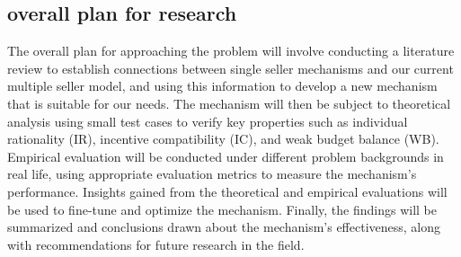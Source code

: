 \subsection{overall plan for research}

The overall plan for approaching the problem will involve conducting a literature review to establish connections between single seller mechanisms and our current multiple seller model, and using this information to develop a new mechanism that is suitable for our needs. The mechanism will then be subject to theoretical analysis using small test cases to verify key properties such as individual rationality (IR), incentive compatibility (IC), and weak budget balance (WB). Empirical evaluation will be conducted under different problem backgrounds in real life, using appropriate evaluation metrics to measure the mechanism's performance. Insights gained from the theoretical and empirical evaluations will be used to fine-tune and optimize the mechanism. Finally, the findings will be summarized and conclusions drawn about the mechanism's effectiveness, along with recommendations for future research in the field.
